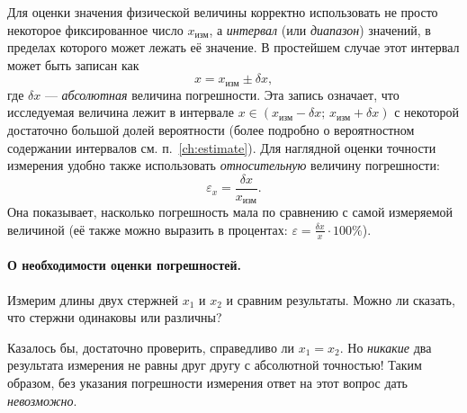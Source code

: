 
Для оценки значения физической величины корректно использовать
не просто некоторое фиксированное число $x_{\text{изм}}$, а \emph{интервал} (или
\emph{диапазон}) значений, в пределах которого может лежать её
 значение. В простейшем случае этот интервал
может быть записан как
\[
x=x_{\text{изм}}\pm\delta x,
\]
где $\delta x$ --- \emph{абсолютная} величина погрешности.
Эта запись означает, что исследуемая величина лежит в интервале
$x\in(x_{\text{изм}}-\delta x;\,x_{\text{изм}}+\delta x)$
с некоторой достаточно большой долей вероятности (более подробно о
вероятностном содержании интервалов см. п.~\ref{ch:estimate}).
Для наглядной оценки точности измерения удобно также использовать
\emph{относительную} величину погрешности:
\[
\varepsilon_{x}=\frac{\delta x}{x_{\text{изм}}}.
\]
Она показывает, насколько погрешность мала по сравнению с
самой измеряемой величиной (её также можно выразить в процентах:
$\varepsilon=\frac{\delta x}{x}\cdot100\%$).


\paragraph{О необходимости оценки погрешностей.}

Измерим длины двух стержней $x_{1}$ и $x_{2}$ и сравним результаты.
Можно ли сказать, что стержни одинаковы или различны?

Казалось бы,
достаточно проверить, справедливо ли $x_{1}=x_{2}$. Но \emph{никакие}
два результата измерения не равны друг другу с абсолютной точностью! Таким
образом, без указания погрешности измерения ответ на этот вопрос дать
\emph{невозможно}.

